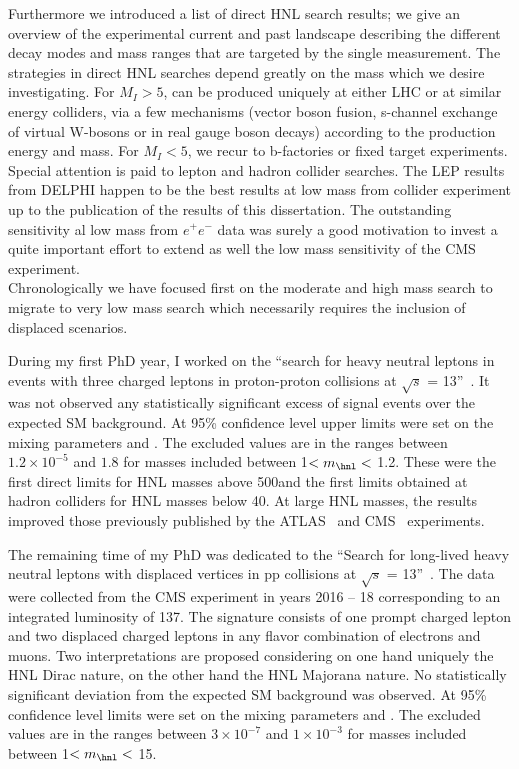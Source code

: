 Furthermore we introduced a list of direct HNL search results; we give an overview
of the experimental current and past landscape describing the different decay modes and
mass ranges that are targeted by the single measurement.
The strategies in direct HNL searches depend greatly on the mass
which we desire investigating. For $M_{I} > 5$\GeV, \hnl can be
produced uniquely at either LHC or at similar energy colliders, via a few
mechanisms (vector boson fusion, s-channel exchange of virtual
W-bosons or in real gauge boson decays) according to the production
energy and \hnl mass. For $M_{I} < 5$\GeV, we recur to b-factories
or fixed target experiments. \\
Special attention is paid to lepton and hadron collider
searches. The LEP results from DELPHI happen to be the best results at
low mass from collider experiment up to the publication of the results
of this dissertation. The outstanding sensitivity al low mass from
$e^{+}e^{-}$ data was surely a good motivation to invest a quite
important effort to extend as well the low mass sensitivity of
the CMS experiment.\\

Chronologically we have focused first on the
moderate and high mass search to migrate to very low mass search which
necessarily requires the inclusion of displaced scenarios.

During my first PhD year, I worked on the ``search for heavy neutral leptons in events with three charged
 leptons in proton-proton collisions at $\sqrt{s}$ =
 13\TeV''~\cite{Sirunyan:2018mtv}. It was not observed any
 statistically significant excess of signal events over the expected
SM background. At 95\% confidence level upper limits were set on the mixing
parameters \mixpare and \mixparm. The excluded values are in the
ranges between $1.2\times 10^{-5}$ and $1.8$ for masses included
between 1\GeV $< m_\hnl <$ 1.2\TeV. 
These were the first direct limits for HNL masses above 500\GeV and the first
limits obtained at hadron colliders for HNL masses below 40\GeV.
At large HNL masses, the results improved those previously published
by the ATLAS~\cite{Aad_2015} and CMS~\cite{Khachatryan_2015,Sirunyan:2018xiv}
experiments. 

The remaining time of my PhD was dedicated to the ``Search for long-lived heavy neutral leptons with displaced
vertices in pp collisions at $\sqrt{s}$ =
 13\TeV''~\cite{CMS-PAS-EXO-20-009}. The data were collected from the
CMS experiment in years 2016 -- 18 corresponding to an integrated
luminosity of 137\fbinv.
The signature consists of one prompt charged lepton and two displaced
charged leptons in any flavor combination of electrons
and muons. Two interpretations are proposed considering on one hand
uniquely the HNL Dirac nature, on the other hand the HNL Majorana nature. 
No statistically significant deviation from the expected
SM background was observed. At 95\% confidence level limits were set on the mixing
parameters \mixpare and \mixparm.
The excluded values are in the
ranges between $3\times 10^{-7}$ and $1\times 10^{-3}$ for masses included
between 1\GeV $< m_\hnl <$ 15\GeV. \\


